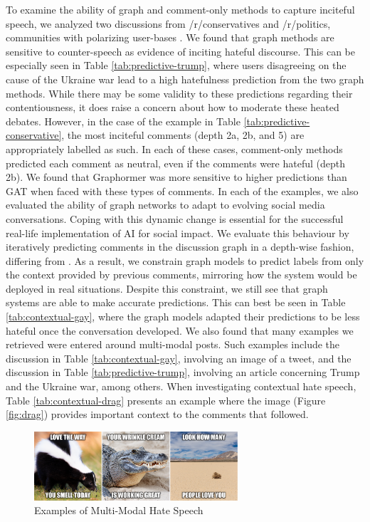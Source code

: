 \documentclass[letterpaper]{article} %
\begin{document}
To examine the ability of graph and comment-only methods to capture inciteful speech, we analyzed two discussions from /r/conservatives and /r/politics, communities with polarizing user-bases \cite{Waller2021}. We found that graph methods are sensitive to counter-speech as evidence of inciting hateful discourse. This can be especially seen in Table \ref{tab:predictive-trump}, where users disagreeing on the cause of the Ukraine war lead to a high hatefulness prediction from the two graph methods. While there may be some validity to these predictions regarding their contentiousness, it does raise a concern about how to moderate these heated debates.
However, in the case of the example in Table \ref{tab:predictive-conservative}, the most inciteful comments (depth 2a, 2b, and 5) are appropriately labelled as such. In each of these cases, comment-only methods predicted each comment as neutral, even if the comments were hateful (depth 2b). We found that Graphormer was more sensitive to higher predictions than GAT when faced with these types of comments.  In each of the examples, we also evaluated the ability of graph networks to adapt to evolving social media conversations. Coping with this dynamic change is essential for the successful real-life implementation of AI for social impact. We evaluate this behaviour by iteratively predicting comments in the discussion graph in a depth-wise fashion, differing from \citet{hebert2022predicting}. As a result, we constrain graph models to predict labels from only the context provided by previous comments, mirroring how the system would be deployed in real situations. Despite this constraint, we still see that graph systems are able to make accurate predictions. This can best be seen in Table \ref{tab:contextual-gay}, where the graph models adapted their predictions to be less hateful once the conversation developed.  We also found that many examples we retrieved were entered around multi-modal posts. Such examples include the discussion in Table \ref{tab:contextual-gay}, involving an image of a tweet, and the discussion in Table \ref{tab:predictive-trump}, involving an article concerning Trump and the Ukraine war, among others. When investigating contextual hate speech, Table \ref{tab:contextual-drag} presents an example where the image (Figure \ref{fig:drag}) provides important context to the comments that followed.

\begin{figure}
\centering
\includegraphics[width=0.9\linewidth,height=1.01in ]{hatefulmemes.png}
\caption{Examples of Multi-Modal Hate Speech}
\label{fig:multimodal}
\end{figure}
\end{document}
